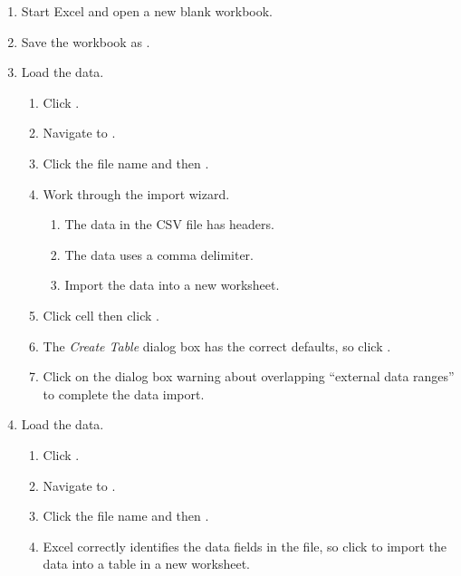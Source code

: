 \begin{enumbox}
	\begin{enumerate}
		\item Start Excel and open a new blank workbook.
		\item Save the workbook as .
	
		\item {} Load the data.
		\begin{enumerate}		
			\item Click .
			\item Navigate to .
			\item Click the file name and then .
			\item Work through the import wizard.
			
			\begin{enumerate}
				\item The data in the CSV file has headers.
				\item The data uses a comma delimiter.
				\item Import the data into a new worksheet.
			\end{enumerate}
		
			\item Click cell  then click .
			\item The \textit{Create Table} dialog box has the correct defaults, so click .
			\item Click  on the dialog box warning about overlapping ``external data ranges'' to complete the data import.
		\end{enumerate}
	
		\item {} Load the data.
		\begin{enumerate}
			\item Click .
			\item Navigate to .
			\item Click the file name and then .
			\item Excel correctly identifies the data fields in the file, so click  to import the data into a table in a new worksheet.	
		\end{enumerate}		
			

\end{enumerate}
\end{enumbox}

